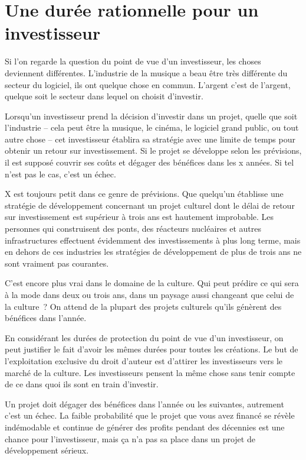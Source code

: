 \section{Une durée rationnelle pour un investisseur}

Si l'on regarde la question du point de vue d’un investisseur, les choses deviennent
différentes. L’industrie de la musique a beau être très différente du secteur du logiciel, ils ont
quelque chose en commun. L’argent c’est de l’argent, quelque soit le secteur dans lequel on choisit d’investir.

Lorsqu’un investisseur prend la décision d’investir dans un projet, quelle que soit l’industrie – cela
peut être la musique, le cinéma, le logiciel grand public, ou tout autre chose – cet investisseur
établira sa stratégie avec une limite de temps pour obtenir un retour sur investissement. Si le
projet se développe selon les prévisions, il est supposé couvrir ses coûts et dégager des bénéfices
dans les x années. Si tel n’est pas le cas, c’est un échec.

X est toujours petit dans ce genre de prévisions. Que quelqu’un établisse une stratégie de
développement concernant un projet culturel dont le délai de retour sur investissement est supérieur
à trois ans est hautement improbable. Les personnes qui construisent des ponts, des réacteurs
nucléaires et autres infrastructures effectuent évidemment des investissements à plus long terme,
mais en dehors de ces industries les stratégies de développement de plus de trois ans ne sont
vraiment pas courantes.

C’est encore plus vrai dans le domaine de la culture. Qui peut prédire ce qui sera à la mode dans
deux ou trois ans, dans un paysage aussi changeant que celui de la culture~? On attend de la plupart
des projets culturels qu’ils génèrent des bénéfices dans l’année.

En considérant les durées de protection du point de vue d’un investisseur, on peut justifier le
fait d’avoir les mêmes durées pour toutes les créations. Le but de l’exploitation exclusive du droit
d’auteur est d’attirer les investisseurs vers le marché de la culture. Les investisseurs pensent
la même chose sans tenir compte de ce dans quoi ils sont en train d’investir.

Un projet doit dégager des bénéfices dans l’année ou les suivantes, autrement
c’est un échec. La faible probabilité que le projet que vous avez financé se révèle indémodable et
continue de générer des profits pendant des décennies est une chance pour l’investisseur, mais ça
n’a pas sa place dans un projet de développement sérieux.

